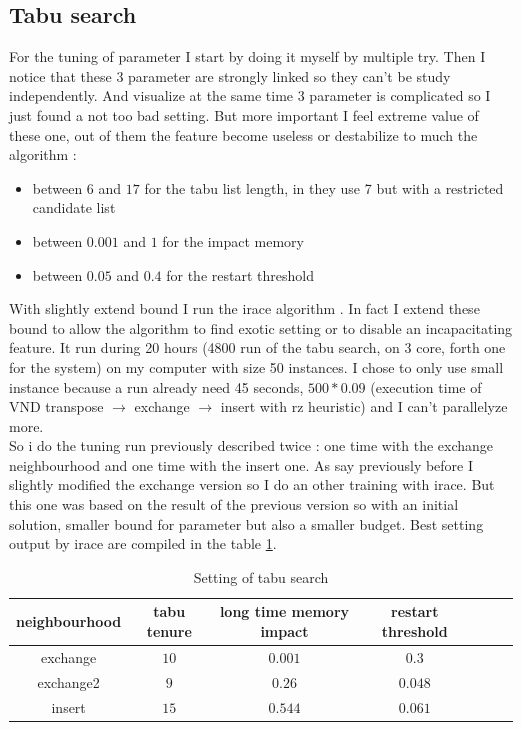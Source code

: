 \documentclass[12pt,a4paper]{article}
\begin{document}
\subsection{Tabu search }

For the tuning of parameter I start by doing it myself by multiple try. Then I notice that these 3 parameter are strongly linked so they can't be study independently. And visualize at the same time 3 parameter is complicated so I just found a not too bad setting. But more important I feel extreme value of these one, out of them the feature become useless or destabilize to much the algorithm :
\begin{itemize}
\item
between $6$ and $17$ for the tabu list length, in \cite{Tseng2010121} they use 7 but with a restricted candidate list
\item
between $0.001$ and $1$ for the impact memory
\item
between $0.05$ and $0.4$ for the restart threshold
\end{itemize}
With slightly extend bound I run the irace algorithm \cite{irace}. In fact I extend these bound to allow the algorithm to find exotic setting or to disable an incapacitating feature. It run during 20 hours (4800 run of the tabu search, on 3 core, forth one for the system) on my computer with size 50 instances. I chose to only use small instance because a run already need 45 seconds, $500 * 0.09$ (execution time of VND transpose $\rightarrow$ exchange $\rightarrow$ insert with rz heuristic) and I can't parallelyze more.\\

So i do the tuning run previously described twice : one time with the exchange neighbourhood and one time with the insert one. As say previously before I slightly modified the exchange version so I do an other training with irace. But this one was based on the result of the previous version so with an initial solution, smaller bound for parameter but also a smaller budget. Best setting output by irace are compiled in the table \ref{Setting of tabu search}.

\begin{table}[!h]
\centering
\begin{tabular}{|*{7}{c|}}
  \hline
  neighbourhood & tabu tenure & long time memory impact & restart threshold \\
  \hline
  exchange & $10$ & $0.001$ & $0.3$ \\ 
  exchange2 & $9$ & $0.26$ & $0.048$ \\
  insert & $15$ & $0.544$ & $0.061$ \\
  \hline
\end{tabular}
\caption{Setting of tabu search}
\label{Setting of tabu search}
\end{table}
\end{document}
